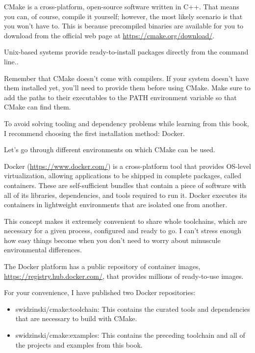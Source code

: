 
CMake is a cross-platform, open-source software written in C++. That means you can, of course, compile it yourself; however, the most likely scenario is that you won't have to. This is because precompiled binaries are available for you to download from the official web page at \url{https://cmake.org/download/}.

Unix-based systems provide ready-to-install packages directly from the command line..

\begin{tcolorbox}[colback=blue!5!white,colframe=blue!75!black,title=Note]
Remember that CMake doesn't come with compilers. If your system doesn't have them installed yet, you'll need to provide them before using CMake. Make sure to add the paths to their executables to the PATH environment variable so that CMake can find them.

To avoid solving tooling and dependency problems while learning from this book, I recommend choosing the first installation method: Docker.
\end{tcolorbox}

Let's go through different environments on which CMake can be used.


Docker (\url{https://www.docker.com/}) is a cross-platform tool that provides OS-level virtualization, allowing applications to be shipped in complete packages, called containers. These are self-sufficient bundles that contain a piece of software with all of its libraries, dependencies, and tools required to run it. Docker executes its containers in lightweight environments that are isolated one from another.

This concept makes it extremely convenient to share whole toolchains, which are necessary for a given process, configured and ready to go. I can't stress enough how easy things become when you don't need to worry about minuscule environmental differences. 

The Docker platform has a public repository of container images, \url{https://registry.hub.docker.com/}, that provides millions of ready-to-use images.

For your convenience, I have published two Docker repositories:

\begin{itemize}
\item 
swidzinski/cmake:toolchain: This contains the curated tools and dependencies that are necessary to build with CMake.

\item 
swidzinski/cmake:examples: This contains the preceding toolchain and all of the projects and examples from this book.
\end{itemize}

